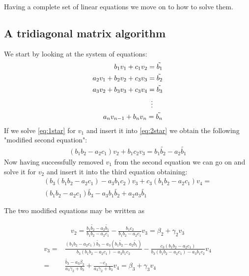 \documentclass[11pt,a4paper,english]{article}
\numberwithin{equation}{section}
\begin{document}
Having a complete set of linear equations we move on to how to solve them.

\subsection{A tridiagonal matrix algorithm}
\label{subsec:Thomas}

We start by looking at the system of equations:
\begin{align}
	 b_1 v_1 + c_1 v_{2} = \tilde{b_1} \label{eq:1star}\\
	 a_2 v_1 + b_2 v_2 + c_3 v_3 = \tilde{b_2} \label{eq:2star}\\
	 a_3 v_2 + b_3 v_3 + c_3 v_4 = \tilde{b_3} \label{eq:3star}\\
\nonumber\vdots \hspace{0.5cm}  \\ 
	 a_n v_{n-1} + b_n v_n = \tilde{b_n} \label{eq:Nstar}
\end{align}
If we solve \eqref{eq:1star} for $v_1$ and insert it into \eqref{eq:2star} we obtain the following "modified second equation":
\begin{align*}
	(b_1 b_2 - a_2 c_1)v_2 + b_1 c_2 v_3 = b_1 \tilde{b_2} - a_2  \tilde{b_1}  
\end{align*}
Now having successfully removed $v_1$ from the second equation we can go on and solve it for $v_2$ and insert it into the third equation obtaining:
\begin{align*}
(b_3 (b_1 b_2 - a_2 c_1)- a_3 b_1 c_2)v_3 + c_3(b_1 b_2 -a_2 c_1)v_4 = \\
(b_1 b_2 - a_2 c_1 ) \tilde{b_3} - a_3 b_1 \tilde{b_2} + a_2 a_3 \tilde{b_1} 
\end{align*}

The two modified equations may be written as 

\begin{align*}
v_2 = \frac{b_1 \tilde{b_2} - a_2 \tilde{b_1}}{b_1 b_2 - a_2 c_1} - \frac{b_1 c_2}{b_1 b_2 - a_2 c_1} v_3 = \beta_2 + \gamma_2 v_3
\end{align*}
\begin{align*}
v_3 =& \frac{(b_1 b_2 - a_2 c_1) \tilde{b_3} - a_3 (b_1 \tilde{b_2} - a_2 \tilde{b_1})}{b_3 (b_1 b_2 - a_2 c_1)- a_3 b_1 c_2} - \frac{c_3(b_1 b_2 - a_2 c_1)}{b_3 (b_1 b_2 - a_2 c_1)- a_3 b_1 c_2} v_4 \\
=&  \frac{\tilde{b_3}-a_3 \beta_2}{a_3 \gamma_2 + b_3} + \frac{-c_3}{a_3 \gamma_2 + b_3}v_4 = \beta_3 + \gamma_3 v_4
\end{align*}
\end{document}
